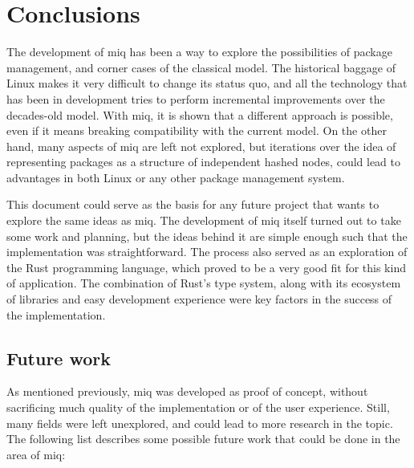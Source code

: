 \chapter{Conclusions}

The development of miq has been a way to
explore the possibilities of package management,
and corner cases of the classical model. The
historical baggage of Linux makes it very difficult
to change its status quo, and all the technology
that has been in development tries to perform
incremental improvements over the decades-old
model. With miq, it is shown that a different
approach is possible, even if it means breaking
compatibility with the current model. On the
other hand, many aspects of miq are left not
explored, but iterations over the idea of representing
packages as a structure of independent hashed
nodes, could lead to advantages in both Linux or
any other package management system.

This document could serve as the basis for any future project
that wants to explore the same ideas as miq. The
development of miq itself turned out to take some work
and planning, but the ideas behind it are simple enough
such that the implementation was straightforward. The
process also served as an exploration of the Rust
programming language, which proved to be a very good fit for
this kind of application. The combination of Rust's type
system, along with its ecosystem of libraries and easy
development experience were key factors in the success of
the implementation.

\section{Future work}

As mentioned previously, miq was developed as proof of
concept, without sacrificing much quality of the
implementation or of the user experience. Still, many fields
were left unexplored, and could lead to more research in the
topic. The following list describes some possible
future work that could be done in the area of miq:

